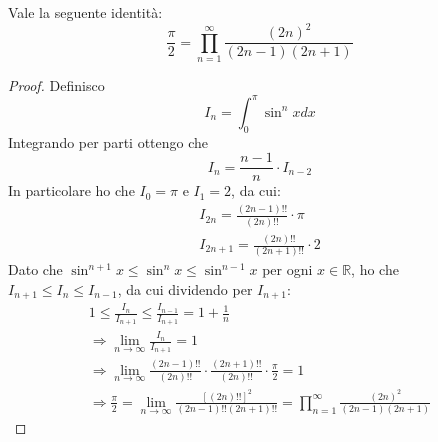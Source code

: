 \begin{lemma}\label{ga:WallisProduct}
	Vale la seguente identità:
	\begin{equation*}
		\frac{\pi}{2}=\prod_{n=1}^\infty\frac{(2n)^2}{(2n-1)(2n+1)}
	\end{equation*}
\end{lemma}
\begin{proof}
	Definisco
	\begin{equation*}
		I_n=\int_0^\pi \sin^n{x} dx
	\end{equation*}
	Integrando per parti ottengo che
	\begin{equation*}
		I_n=\frac{n-1}{n}\cdot I_{n-2}
	\end{equation*}
	In particolare ho che $I_0=\pi$ e $I_1=2$, da cui:
	\begin{gather*}
		I_{2n}=\frac{(2n-1)!!}{(2n)!!}\cdot\pi\\
		I_{2n+1}=\frac{(2n)!!}{(2n+1)!!}\cdot 2
	\end{gather*}
	Dato che $\sin^{n+1}x\le \sin^n x\le \sin^{n-1} x$ per ogni $x\in\mathbb{R}$, ho che $I_{n+1}\le I_n\le I_{n-1}$,
	da cui dividendo per $I_{n+1}$:
	\begin{gather*}
		1\le \frac{I_n}{I_{n+1}}\le \frac{I_{n-1}}{I_{n+1}}=1+\frac{1}{n}\\
		\Longrightarrow \lim_{n\to\infty}\frac{I_n}{I_{n+1}}=1\\
		\Longrightarrow \lim_{n\to\infty}\frac{(2n-1)!!}{(2n)!!}\cdot\frac{(2n+1)!!}{(2n)!!}\cdot\frac{\pi}{2}=1\\
		\Longrightarrow \frac{\pi}{2}=\lim_{n\to\infty}\frac{\left[(2n)!!\right]^2}{(2n-1)!!(2n+1)!!}=\prod_{n=1}^\infty\frac{(2n)^2}{(2n-1)(2n+1)}
	\end{gather*}





\end{proof}



